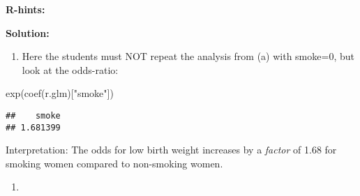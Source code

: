 \documentclass[
]{article}
\newenvironment{Shaded}{\begin{snugshade}}{\end{snugshade}}
\newcommand{\AttributeTok}[1]{\textcolor[rgb]{0.77,0.63,0.00}{#1}}
\newcommand{\DecValTok}[1]{\textcolor[rgb]{0.00,0.00,0.81}{#1}}
\newcommand{\FunctionTok}[1]{\textcolor[rgb]{0.00,0.00,0.00}{#1}}
\newcommand{\NormalTok}[1]{#1}
\newcommand{\OtherTok}[1]{\textcolor[rgb]{0.56,0.35,0.01}{#1}}
\newcommand{\SpecialCharTok}[1]{\textcolor[rgb]{0.00,0.00,0.00}{#1}}
\newcommand{\StringTok}[1]{\textcolor[rgb]{0.31,0.60,0.02}{#1}}
\providecommand{\tightlist}{%
  \setlength{\itemsep}{0pt}\setlength{\parskip}{0pt}}
\begin{document}
\textbf{R-hints:}

\begin{Shaded}
\end{Shaded}

\textbf{Solution:}

\begin{enumerate}
\def\labelenumi{(\roman{enumi})}
\tightlist
\item
  Here the students must NOT repeat the analysis from (a) with smoke=0,
  but look at the odds-ratio:
\end{enumerate}

\begin{Shaded}
\begin{Highlighting}[]
\FunctionTok{exp}\NormalTok{(}\FunctionTok{coef}\NormalTok{(r.glm)[}\StringTok{"smoke"}\NormalTok{])}
\end{Highlighting}
\end{Shaded}

\begin{verbatim}
##    smoke 
## 1.681399
\end{verbatim}

Interpretation: The odds for low birth weight increases by a
\emph{factor} of 1.68 for smoking women compared to non-smoking women.

\begin{enumerate}
\def\labelenumi{(\roman{enumi})}
\setcounter{enumi}{1}
\tightlist
\item
\end{enumerate}

\begin{Shaded}
\end{Shaded}
\end{document}
